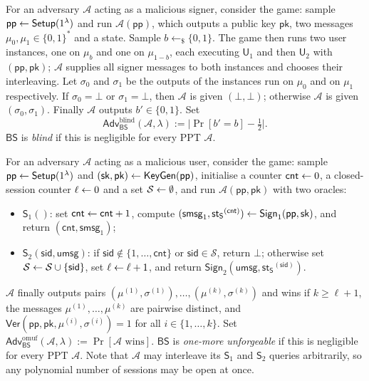 \documentclass{aicr-conjecture}
\newcommand{\BS}{\mathsf{BS}}
\newcommand{\Setup}{\mathsf{Setup}}
\newcommand{\KeyGen}{\mathsf{KeyGen}}
\newcommand{\Sign}{\mathsf{Sign}}
\newcommand{\Uu}{\mathsf{U}}
\newcommand{\Ver}{\mathsf{Ver}}
\newcommand{\pubp}{\mathsf{pp}}
\newcommand{\seck}{\mathsf{sk}}
\newcommand{\pubk}{\mathsf{pk}}
\newcommand{\smsg}{\mathsf{smsg}}
\newcommand{\umsg}{\mathsf{umsg}}
\newcommand{\stS}{\mathsf{st_S}}
\newcommand{\Adv}{\mathsf{Adv}}
\newcommand{\Sorc}{\mathsf{S}}
\newcommand{\cnt}{\mathsf{cnt}}
\newcommand{\sessid}{\mathsf{sid}}
\newcommand{\Ablind}{\Adv^{\mathrm{blind}}}
\newcommand{\Aomuf}{\Adv^{\mathrm{omuf}}}
\newcommand{\rsample}{\leftarrow_{\$}}
\newcommand{\advA}{\mathcal{A}}
\begin{document}
\begin{definition}[Blindness]\label{def:blind}
For an adversary $\advA$ acting as a malicious signer, consider the game:
sample $\pubp \sample \Setup(1^\lambda)$ and run $\advA(\pubp)$, which
outputs a public key $\pubk$, two messages
$\mu_0, \mu_1 \in \{0,1\}^*$ and a state. Sample $b \rsample \{0,1\}$.
The game then runs two user instances, one on $\mu_b$ and one on
$\mu_{1-b}$, each executing $\Uu_1$ and then $\Uu_2$ with
$(\pubp, \pubk)$; $\advA$ supplies all signer messages to both instances
and chooses their interleaving. Let $\sigma_0$ and $\sigma_1$ be the
outputs of the instances run on $\mu_0$ and on $\mu_1$ respectively. If
$\sigma_0 = \bot$ or $\sigma_1 = \bot$, then $\advA$ is given
$(\bot, \bot)$; otherwise $\advA$ is given $(\sigma_0, \sigma_1)$.
Finally $\advA$ outputs $b' \in \{0,1\}$. Set
\[
  \Ablind_{\BS}(\advA, \lambda) := \bigl| \Pr[b' = b] - \tfrac{1}{2}
  \bigr| .
\]
$\BS$ is \emph{blind} if this is negligible for every PPT $\advA$.
\end{definition}

\begin{definition}\label{def:omuf}
For an adversary $\advA$ acting as a malicious user, consider the game:
sample $\pubp \sample \Setup(1^\lambda)$ and
$(\seck, \pubk) \sample \KeyGen(\pubp)$, initialise a counter
$\cnt \sample 0$, a closed-session counter $\ell \leftarrow 0$ and a set
$\mathcal{S} \leftarrow \emptyset$, and run $\advA(\pubp, \pubk)$ with two
oracles:
\begin{itemize}
  \item $\Sorc_1()$: set $\cnt \sample \cnt + 1$, compute
  $(\smsg_{1}, \stS^{(\cnt)}) \sample \Sign_1(\pubp, \seck)$, and return
  $(\cnt, \smsg_{1})$;
  \item $\Sorc_2(\sessid, \umsg)$: if
  $\sessid \notin \{1, \dots, \cnt\}$ or $\sessid \in \mathcal{S}$,
  return $\bot$; otherwise set
  $\mathcal{S} \sample \mathcal{S} \cup \{\sessid\}$, set
  $\ell \leftarrow \ell + 1$, and return
  $\Sign_2(\umsg, \stS^{(\sessid)})$.
\end{itemize}
$\advA$ finally outputs pairs
$(\mu^{(1)}, \sigma^{(1)}), \dots, (\mu^{(k)}, \sigma^{(k)})$ and wins if
$k \geq \ell + 1$, the messages $\mu^{(1)}, \dots, \mu^{(k)}$ are pairwise
distinct, and $\Ver(\pubp, \pubk, \mu^{(i)}, \sigma^{(i)}) = 1$ for all
$i \in \{1, \dots, k\}$. Set
$\Aomuf_{\BS}(\advA, \lambda) := \Pr[\advA \text{ wins}]$. $\BS$ is
\emph{one-more unforgeable} if this is negligible for every PPT $\advA$.
Note that $\advA$ may interleave its $\Sorc_1$ and $\Sorc_2$ queries
arbitrarily, so any polynomial number of sessions may be open at once.
\end{definition}
\end{document}
